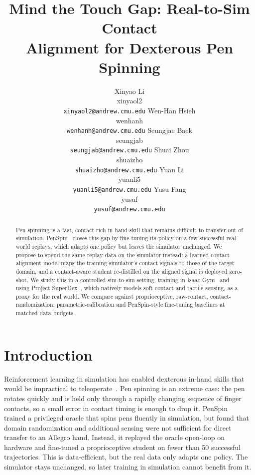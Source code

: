 \documentclass{article}
\title{{\Large Mind the Touch Gap: Real-to-Sim Contact\\Alignment for Dexterous Pen Spinning}}
\author{
  Xinyao Li\\{\normalfont\small xinyaol2}\\{\normalfont\small\texttt{xinyaol2@andrew.cmu.edu}}
  \And
  Wen-Han Hsieh\\{\normalfont\small wenhanh}\\{\normalfont\small\texttt{wenhanh@andrew.cmu.edu}}
  \And
  Seungjae Baek\\{\normalfont\small seungjab}\\{\normalfont\small\texttt{seungjab@andrew.cmu.edu}}
  \AND
  Shuai Zhou\\{\normalfont\small shuaizho}\\{\normalfont\small\texttt{shuaizho@andrew.cmu.edu}}
  \And
  Yuan Li\\{\normalfont\small yuanli5}\\{\normalfont\small\texttt{yuanli5@andrew.cmu.edu}}
  \And
  Yusu Fang\\{\normalfont\small yusuf}\\{\normalfont\small\texttt{yusuf@andrew.cmu.edu}}
}
\begin{document}
\maketitle

\begin{abstract}
Pen spinning is a fast, contact-rich in-hand skill that remains difficult to transfer out of simulation. PenSpin~\citep{wang2024penspin} closes this gap by fine-tuning its policy on a few successful real-world replays, which adapts one policy but leaves the simulator unchanged. We propose to spend the same replay data on the simulator instead: a learned contact alignment model maps the training simulator's contact signals to those of the target domain, and a contact-aware student re-distilled on the aligned signal is deployed zero-shot. We study this in a controlled sim-to-sim setting, training in Isaac Gym~\citep{makoviychuk2021isaac} and using Project SuperDex~\citep{superdex2026}, which natively models soft contact and tactile sensing, as a proxy for the real world. We compare against proprioceptive, raw-contact, contact-randomization, parametric-calibration and PenSpin-style fine-tuning baselines at matched data budgets.
\end{abstract}

\section{Introduction}

Reinforcement learning in simulation has enabled dexterous in-hand skills that would be impractical to teleoperate~\citep{openai2020dexterous,qi2022hora,qi2023general}. Pen spinning is an extreme case: the pen rotates quickly and is held only through a rapidly changing sequence of finger contacts, so a small error in contact timing is enough to drop it. PenSpin~\citep{wang2024penspin} trained a privileged oracle that spins pens fluently in simulation, but found that domain randomization and additional sensing were not sufficient for direct transfer to an Allegro hand. Instead, it replayed the oracle open-loop on hardware and fine-tuned a proprioceptive student on fewer than 50 successful trajectories. This is data-efficient, but the real data only adapts one policy. The simulator stays unchanged, so later training in simulation cannot benefit from it.
\end{document}
